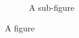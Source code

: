 \documentclass{article}
\begin{document}
\begin{figure}
\begin{subfigure}{\textwidth}
\aaaaaaa
\caption{A sub-figure}
\end{subfigure}
\caption{A figure}
\end{figure}
\end{document}

